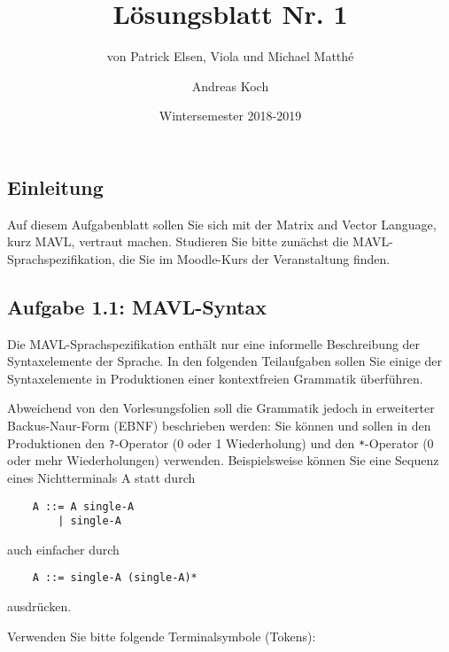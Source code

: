 \documentclass[
  ngerman,
  DIV=14
]{scrartcl}
\title{Lösungsblatt Nr. 1}
\date{Wintersemester 2018-2019}
\author{Andreas Koch}
\subtitle{von Patrick Elsen, Viola und Michael Matthé}
\begin{document}
\maketitle

\subsection*{Einleitung}

Auf diesem Aufgabenblatt sollen Sie sich mit der Matrix and Vector Language, kurz MAVL, vertraut machen. Studieren Sie bitte zunächst die MAVL-Sprachspezifikation, die Sie im Moodle-Kurs der Veranstaltung finden.

\subsection*{Aufgabe 1.1: MAVL-Syntax}

Die MAVL-Sprachspezifikation enthält nur eine informelle Beschreibung der Syntaxelemente der Sprache. In den folgenden Teilaufgaben sollen Sie einige der Syntaxelemente in Produktionen einer kontextfreien Grammatik überführen.

\medskip\noindent
Abweichend von den Vorlesungsfolien soll die Grammatik jedoch in erweiterter Backus-Naur-Form (EBNF) beschrieben werden: Sie können und sollen in den Produktionen den \verb|?|-Operator (0 oder 1 Wiederholung) und den \verb|*|-Operator (0 oder mehr Wiederholungen) verwenden. Beispielsweise können Sie eine Sequenz eines Nichtterminals A statt durch
\begin{verbatim}
    A ::= A single-A
        | single-A
\end{verbatim}
auch einfacher durch
\begin{verbatim}
    A ::= single-A (single-A)*
\end{verbatim}
ausdrücken.

\medskip\noindent
Verwenden Sie bitte folgende Terminalsymbole (Tokens):
\end{document}

